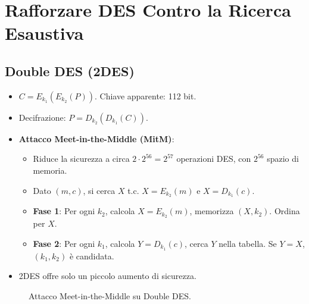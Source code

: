 \documentclass{article}
\begin{document}
\section{Rafforzare DES Contro la Ricerca Esaustiva}

\subsection{Double DES (2DES)}
\begin{itemize}
    \item $C = E_{k_1}(E_{k_2}(P))$. Chiave apparente: 112 bit.
    \item Decifrazione: $P = D_{k_2}(D_{k_1}(C))$.
    \item \textbf{Attacco Meet-in-the-Middle (MitM)}:
    \begin{itemize}
        \item Riduce la sicurezza a circa $2 \cdot 2^{56} = 2^{57}$ operazioni DES, con $2^{56}$ spazio di memoria.
        \item Dato $(m,c)$, si cerca $X$ t.c. $X = E_{k_2}(m)$ e $X = D_{k_1}(c)$.
        \item \textbf{Fase 1}: Per ogni $k_2$, calcola $X = E_{k_2}(m)$, memorizza $(X, k_2)$. Ordina per $X$.
        \item \textbf{Fase 2}: Per ogni $k_1$, calcola $Y = D_{k_1}(c)$, cerca $Y$ nella tabella. Se $Y=X$, $(k_1, k_2)$ è candidata.
    \end{itemize}
    \item 2DES offre solo un piccolo aumento di sicurezza.
\end{itemize}

\begin{figure}[H]
\centering
{}
\caption{Attacco Meet-in-the-Middle su Double DES.}
\end{figure}
\end{document}
